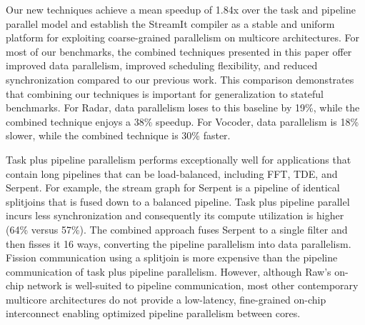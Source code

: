 Our new techniques achieve a mean speedup of 1.84x over the task and
pipeline parallel model and establish the StreamIt compiler as a
stable and uniform platform for exploiting coarse-grained parallelism
on multicore architectures. For most of our benchmarks, the combined
techniques presented in this paper offer improved data parallelism,
improved scheduling flexibility, and reduced synchronization compared
to our previous work. This comparison demonstrates that combining our
techniques is important for generalization to stateful benchmarks.
For Radar, data parallelism loses to this baseline by 19\%, while the
combined technique enjoys a 38\% speedup. For Vocoder, data
parallelism is 18\% slower, while the combined technique is 30\%
faster.

Task plus pipeline parallelism performs exceptionally well for
applications that contain long pipelines that can be load-balanced,
including FFT, TDE, and Serpent.  For example, the stream graph for
Serpent is a pipeline of identical splitjoins that is fused down to a
balanced pipeline.  Task plus pipeline parallel incurs less
synchronization and consequently its compute utilization is higher
(64\% versus 57\%).  The combined approach fuses Serpent to a single
filter and then fisses it 16 ways, converting the pipeline parallelism
into data parallelism.  Fission communication using a splitjoin is
more expensive than the pipeline communication of task plus pipeline
parallelism.  However, although Raw's on-chip network is well-suited to
pipeline communication, most other contemporary multicore
architectures do not provide a low-latency, fine-grained on-chip
interconnect enabling optimized pipeline parallelism between cores.







